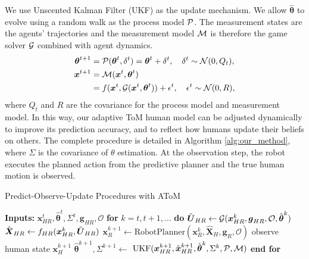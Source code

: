 We use Unscented Kalman Filter (UKF) \cite{wan2000unscented} as the update mechanism. We allow $\hat{\boldsymbol{\theta}}$ to evolve using a random walk as the process model $\mathcal{P}$. The measurement states are the agents' trajectories and the measurement model $\mathcal{M}$ is therefore the game solver $\mathcal{G}$ combined with agent dynamics.
\begin{equation}
\begin{aligned}
    \boldsymbol{\theta}^{t+1} &= \mathcal{P}(\boldsymbol{\theta}^{t}, \delta^{t}) = \boldsymbol{\theta}^{t} + \delta^{t}, \quad \delta^t \sim \mathcal{N}(0, Q_t), \\
    \boldsymbol{x}^{t+1} &= \mathcal{M}(\boldsymbol{x}^{t}, \boldsymbol{\theta}^{t}) \\
            &= f(\boldsymbol{x}^{t}, \mathcal{G}(\boldsymbol{x}^{t}, \boldsymbol{\theta}^{t})) + \epsilon^{t}, \quad \epsilon^t \sim \mathcal{N}(0, R),
\end{aligned}
\end{equation}
where $Q_{t}$ and $R$ are the covariance for the process model and measurement model.
In this way, our adaptive ToM human model can be adjusted dynamically to improve its prediction accuracy, and to reflect how humans update their beliefs on others. The complete procedure is detailed in Algorithm \ref{alg:our_method}, where $\Sigma$ is the covariance of $\theta$ estimation.
At the observation step, the robot executes the planned action from the predictive planner and the true human motion is observed.

\begin{algorithm}
\caption{Predict-Observe-Update Procedures with AToM}
\label{alg:our_method}
\begin{algorithmic}[1]
\State \textbf{Inputs:} $\boldsymbol{x}_{HR}^{t}, \hat{\boldsymbol{\theta}}^{t}, \Sigma^{t}, \boldsymbol{g}_{HR}, \mathcal{O}$
\State \textbf{for} $k = t, t+1, \dots$ \textbf{do}
    \State \quad $\tilde{\boldsymbol{U}}_{HR} \gets \mathcal{G}(\boldsymbol{x}_{HR}^{k}, \boldsymbol{g}_{HR}, \mathcal{O}, \hat{\boldsymbol{\theta}}^{k})$ 
    \State \quad $\hat{\boldsymbol{X}}_{HR} \gets f_{HR}(\boldsymbol{x}_{HR}^{k}, \tilde{\boldsymbol{U}}_{HR})$
    \State \quad $\boldsymbol{x}_{R}^{k+1} \gets \text{RobotPlanner}(\boldsymbol{x}_{R}^{k}, \hat{\boldsymbol{X}}_{H}, \boldsymbol{g}_{R}, \mathcal{O})$
    \State \quad observe human state $\boldsymbol{x}_{H}^{k+1}$ 
    \State \quad $\hat{\boldsymbol{\theta}}^{k+1}, \Sigma^{k+1} \gets $
    \Statex \quad $\text{UKF}(\boldsymbol{x}_{HR}^{k+1}, \hat{\boldsymbol{x}}_{HR}^{k+1}, \hat{\boldsymbol{\theta}}^{k}, \Sigma^{k}, \mathcal{P}, \mathcal{M})$ 
\State \textbf{end for}
\end{algorithmic}
\end{algorithm}

